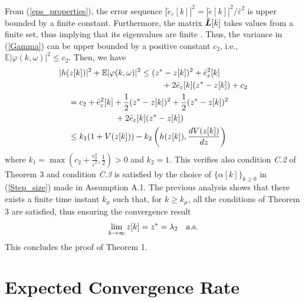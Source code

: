 \documentclass[10pt,twocolumn]{IEEEtran}
\def\bL{\mbox{\boldmath $L$}}
\begin{document}
From (\ref{eps_properties}), the error sequence $|\tilde{e}_{\varepsilon}[k]|^2=|\tilde{e}[k]|^2/\bar{\varepsilon}^2$ is upper bounded by a finite constant. Furthermore, the matrix $\tilde{\bL}[k]$ takes values from a finite set, thus implying that its eigenvalues are finite \cite{Horn-Johnson}. Thus, the variance in (\ref{Gamma}) can be upper bounded by a positive constant $c_2$, i.e., $\mathbb{E}|\varphi(k,\omega)|^2 \leq c_2$. Then, we have
\begin{align}
|h(z[k])|^2&+\mathbb{E}|\varphi(k,\omega)|^2\leq  (z^*-z[k])^2+\bar{e}^2_{\varepsilon}[k] \nonumber\\
&\hspace{3cm}+2\bar{e}_{\varepsilon}[k](z^*-z[k])+c_2 \nonumber\\
& \hspace{-1cm}=c_2+\bar{e}^2_{\varepsilon}[k] +\frac{1}{2}(z^*-z[k])^2+\frac{1}{2}(z^*-z[k])^2 \nonumber\\
& \hspace{1cm}+2\bar{e}_{\varepsilon}[k](z^*-z[k])  \nonumber\\
&\hspace{-1cm} \leq k_1(1+V(z[k]))-k_2\left(h(z[k]),\frac{dV(z[k])}{dz}\right)
\end{align}
where $k_1=\max\left(c_2+\frac{e^2_0}{\bar{\varepsilon}^2},\frac{1}{2}\right)>0$ and $k_2=1$.  This verifies also condition \textit{C.2} of Theorem 3 and condition \textit{C.3} is satisfied by the choice of $\{\alpha[k]\}_{k\geq0}$ in (\ref{Step_size}) made in Assumption A.1. The previous analysis shows that there exists a finite time instant $k_\mu$ such that, for $k\geq k_\mu$, all the conditions of Theorem 3 are satisfied, thus ensuring the convergence result
\begin{eqnarray}
\lim_{k\rightarrow\infty} z[k]= z^*=\lambda_{2} \quad \hbox{a.s.}
\end{eqnarray}
This concludes the proof of Theorem 1.



\section{Expected Convergence Rate}
\end{document}
